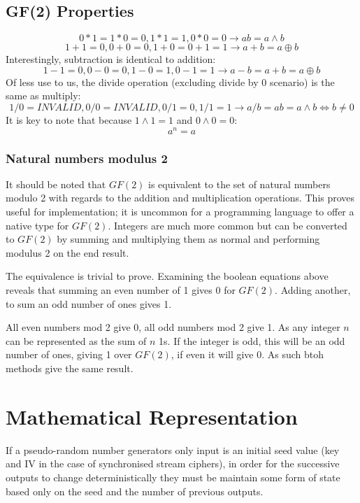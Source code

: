 \documentclass{report}
\let\Oldsection\section
\renewcommand{\section}{\FloatBarrier\Oldsection}
\let\Oldsubsection\subsection
\renewcommand{\subsection}{\FloatBarrier\Oldsubsection}
\let\Oldsubsubsection\subsubsection
\renewcommand{\subsubsection}{\FloatBarrier\Oldsubsubsection}
\begin{document}
\subsection{GF(2) Properties}
\begin{equation} \label{eq:GFtimes}
0*1 = 1*0=0, 1*1=1, 0*0=0 \to ab = a \land b
\end{equation}
\begin{equation} \label{eq:GFadd}
1+1=0, 0+0=0, 1+0=0+1=1 \to a+b = a \oplus b
\end{equation}
Interestingly, subtraction is identical to addition:
\begin{equation} \label{eq:GFminus}
1-1=0, 0-0=0, 1-0=1, 0-1=1 \to a-b = a+b = a \oplus b
\end{equation}
Of less use to us, the divide operation (excluding divide by 0 scenario) is the same as multiply:
\begin{equation} \label{eq:GFdivide}
1/0=\mathit{INVALID}, 0/0=\mathit{INVALID}, 0/1=0, 1/1=1 \to a/b = ab = a \land b \iff b \neq 0
\end{equation}
It is key to note that because $1\land1=1$ and $0\land0 = 0$:
\begin{equation} \label{eq:GFpowers}
a^n = a
\end{equation}

\subsubsection{Natural numbers modulus 2}
It should be noted that $\mathit{GF(2)}$ is equivalent to the set of natural numbers modulo 2 with regards to the addition and multiplication operations. This proves useful for implementation; it is uncommon for a programming language to offer a native type for $\mathit{GF(2)}$. Integers are much more common but can be converted to $\mathit{GF(2)}$ by summing and multiplying them as normal and performing modulus 2 on the end result.

The equivalence is trivial to prove. Examining the boolean equations above reveals that summing an even number of 1 gives 0 for $GF(2)$. Adding another, to sum an odd number of ones gives 1.

All even numbers mod 2 give 0, all odd numbers mod 2 give 1. As any integer $n$ can be represented as the sum of $n$ 1s. If the integer is odd, this will be an odd number of ones, giving 1 over $GF(2)$, if even it will give 0. As such btoh methods give the same result.

\section{Mathematical Representation}
If a pseudo-random number generators only input is an initial seed value (key and IV in the case of synchronised stream ciphers), in order for the successive outputs to change deterministically they must be maintain some form of state based only on the seed and the number of previous outputs.
\end{document}
